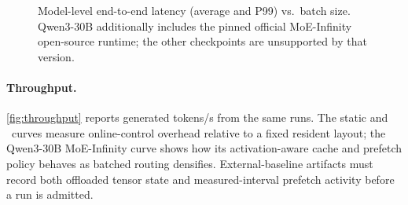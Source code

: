 \begin{figure}[t]
    \centering
    \begin{minipage}{0.32\linewidth}
        \centering
    \end{minipage}
    \begin{minipage}{0.32\linewidth}
        \centering
    \end{minipage}
    \begin{minipage}{0.32\linewidth}
        \centering
    \end{minipage}
    \begin{minipage}{0.32\linewidth}
        \centering
    \end{minipage}
    \begin{minipage}{0.32\linewidth}
        \centering
    \end{minipage}
    \begin{minipage}{0.32\linewidth}
        \centering
    \end{minipage}
    \caption{Model-level end-to-end latency (average and P99) vs.\ batch size. Qwen3-30B additionally includes the pinned official MoE-Infinity open-source runtime; the other checkpoints are unsupported by that version.}
    \label{fig:end2end}
    \vspace{-1em}
\end{figure}

\paragraph{Throughput.}
\autoref{fig:throughput} reports generated tokens/s from the same runs. The static and \systemname\ curves measure online-control overhead relative to a fixed resident layout; the Qwen3-30B MoE-Infinity curve shows how its activation-aware cache and prefetch policy behaves as batched routing densifies. External-baseline artifacts must record both offloaded tensor state and measured-interval prefetch activity before a run is admitted.

